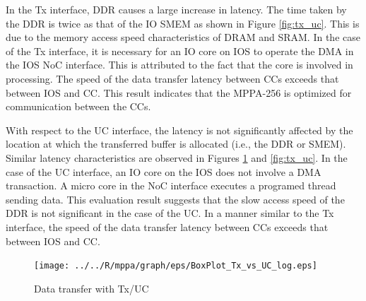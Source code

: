 \documentclass[conference,compsoc]{IEEEtran}
\begin{document}
In the Tx interface, DDR causes a large increase in latency.
The time taken by the DDR is twice as that of the IO SMEM as shown in Figure \ref{fig:tx_uc}.
This is due to the memory access speed characteristics of DRAM and SRAM.
In the case of the Tx interface, it is necessary for an IO core on IOS to operate the DMA in the IOS NoC interface.
This is attributed to the fact that the core is involved in processing.
The speed of the data transfer latency between CCs exceeds that between IOS and CC.
This result indicates that the MPPA-256 is optimized for communication between the CCs.

With respect to the UC interface, the latency is not significantly affected by the location at which the transferred buffer is allocated (i.e., the DDR or SMEM).
Similar latency characteristics are observed in Figures \ref{fig:tx_uc_log} and \ref{fig:tx_uc}.
In the case of the UC interface, an IO core on the IOS does not involve a DMA transaction.
A micro core in the NoC interface executes a programed thread sending data.
This evaluation result suggests that the slow access speed of the DDR is not significant in the case of the UC.
In a manner similar to the Tx interface, the speed of the data transfer latency between CCs exceeds that between IOS and CC.

\begin{figure}[t]
  \centering
  \texttt{[image: ../../R/mppa/graph/eps/BoxPlot\_Tx\_vs\_UC\_log.eps]}
  \caption{\label{fig:tx_uc_log}
    Data transfer with Tx/UC }
\end{figure}
\end{document}
